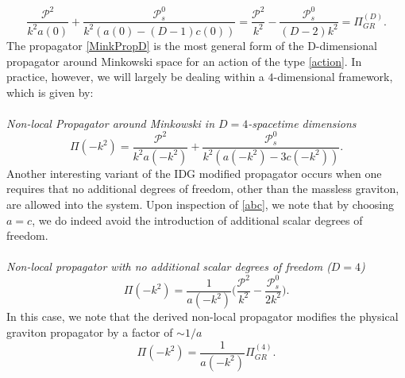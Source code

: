 \[
\label{GRprop}
\frac{\mathcal{P}^{2}}{k^{2}a(0)}+\frac{\mathcal{P}_{s}^{0}}{k^{2}(a(0)-(D-1)c(0))}=\frac{\mathcal{P}^{2}}{k^{2}}-\frac{\mathcal{P}_{s}^{0}}{(D-2)k^{2}}=\Pi_{GR}^{(D)}.
\]
The propagator \eqref{MinkPropD} is the most general form of the D-dimensional propagator around Minkowski space for an action of the type \eqref{action}. In practice, however, we will largely be dealing within a $4$-dimensional framework, which is given by:
\\\\\emph{Non-local Propagator around Minkowski in $D=4$-spacetime dimensions}
\[
\label{MinkProp4}
\Pi(-k^{2})=\frac{\mathcal{P}^{2}}{k^{2}a(-k^{2})}+\frac{\mathcal{P}_{s}^{0}}{k^{2}\left(a(-k^{2})-3c(-k^{2})\right)}
. \]
Another interesting variant of the IDG modified propagator occurs when one requires that no additional degrees of freedom, other than the massless graviton, are allowed into the system. Upon inspection of \eqref{abc}, we note that by choosing $a=c$, we do indeed avoid the introduction of additional scalar degrees of freedom. 
\\\\ \emph{Non-local propagator with no  additional scalar degrees of freedom ($D=4$)}
\\
\begin{equation}
\label{MinkPropAC}
\Pi(-k^{2})=\frac{1}{a(-k^{2})}\biggl(\frac{\mathcal{P}^{2}}{k^2}-\frac{\mathcal{P}_{s}^{0}}{2k^2}\biggr).
 \end{equation}
 In this case, we note that the derived non-local propagator modifies the physical graviton propagator by a factor of $\sim 1/a$
 \[
 \Pi(-k^2)=\frac{1}{a(-k^{2})}\Pi^{(4)}_{GR}
. \]
